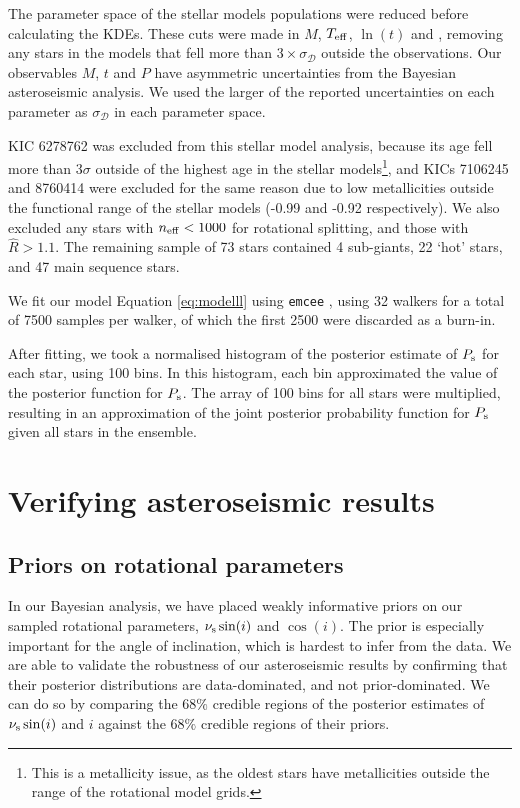 The parameter space of the stellar models populations were reduced before calculating the KDEs. These cuts were made in $M$, $\mbox{$T_{\rm eff}$}$, $\ln(t)$ and \feh, removing any stars in the models that fell more than $3 \times \sigma_{\mathcal{D}}$ outside the observations. Our observables $M$, $t$ and $P$ have asymmetric uncertainties from the Bayesian asteroseismic analysis. We used the larger of the reported uncertainties on each parameter as $\sigma_{\mathcal{D}}$ in each parameter space. 

KIC 6278762 was excluded from this stellar model analysis, because its age fell more than $3\sigma$ outside of the highest age in the stellar models\footnote{This is a metallicity issue, as the oldest stars have metallicities outside the range of the rotational model grids.}, and KICs 7106245 and 8760414 were excluded for the same reason due to low metallicities outside the functional range of the stellar models (-0.99 and -0.92 respectively). We also excluded any stars with $n_{\rm eff} < 1000$ for rotational splitting, and those with $\hat{R} > 1.1$. The remaining sample of 73 stars contained 4 sub-giants, 22 `hot' stars, and 47 main sequence stars.

We fit our model Equation \ref{eq:modelll} using \texttt{emcee} \cite{m_foreman-mackey+2013, m_foreman-mackey2016}, using 32 walkers for a total of 7500 samples per walker, of which the first 2500 were discarded as a burn-in.

After fitting, we took a normalised histogram of the posterior estimate of $P_{\rm s}$ for each star, using 100 bins. In this histogram, each bin approximated the value of the posterior function for $P_{\rm s}$. The array of 100 bins for all stars were multiplied, resulting in an approximation of the joint posterior probability function for $P_{\rm s}$ given all stars in the ensemble.

\section{Verifying asteroseismic results}
\subsection{Priors on rotational parameters}
In our Bayesian analysis, we have placed weakly informative priors on our sampled rotational parameters, $\nu_{\rm s}\sin(i)$ and $\cos(i)$. The prior is especially important for the angle of inclination, which is hardest to infer from the data. We are able to validate the robustness of our asteroseismic results by confirming that their posterior distributions are data-dominated, and not prior-dominated. We can do so by comparing the $68\%$ credible regions of the posterior estimates of $\nu_{\rm s}\sin(i)$ and $i$ against the $68\%$ credible regions of their priors.


